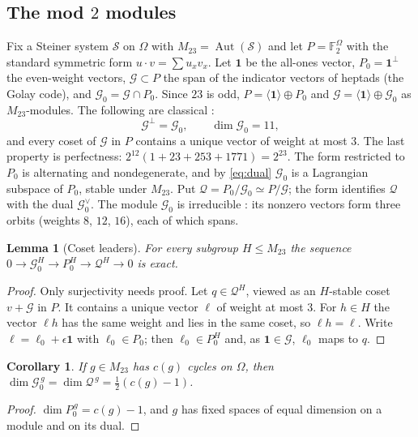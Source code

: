 \documentclass[11pt]{amsart}
\newtheorem{lemma}[theorem]{Lemma}
\newtheorem{corollary}[theorem]{Corollary}
\theoremstyle{definition}
\newcommand{\FF}{\mathbb{F}}
\newcommand{\Aut}{\operatorname{Aut}}
\newcommand{\M}{M_{23}}
\newcommand{\cG}{\mathcal{G}}
\newcommand{\cQ}{\mathcal{Q}}
\newcommand{\cS}{\mathcal{S}}
\newcommand{\one}{\mathbf{1}}
\begin{document}


\subsection{The mod $2$ modules}\label{ssec:modules}
Fix a Steiner system $\cS$ on $\Omega$ with $\M=\Aut(\cS)$ and let $P=\FF_2^\Omega$ with the standard symmetric form $u\cdot v=\sum u_xv_x$. Let $\one$ be the all-ones vector, $P_0=\one^\perp$ the even-weight vectors, $\cG\subset P$ the span of the indicator vectors of heptads (the Golay code), and $\cG_0=\cG\cap P_0$. Since $23$ is odd, $P=\langle\one\rangle\oplus P_0$ and $\cG=\langle\one\rangle\oplus\cG_0$ as $\M$-modules. The following are classical \cite{MS77}:
\begin{equation}\label{eq:dual}
\cG^\perp=\cG_0,\qquad \dim\cG_0=11,
\end{equation}
and every coset of $\cG$ in $P$ contains a unique vector of weight at most $3$. The last property is perfectness: $2^{12}(1+23+253+1771)=2^{23}$. The form restricted to $P_0$ is alternating and nondegenerate, and by \eqref{eq:dual} $\cG_0$ is a Lagrangian subspace of $P_0$, stable under $\M$. Put $\cQ=P_0/\cG_0\simeq P/\cG$; the form identifies $\cQ$ with the dual $\cG_0^\vee$. The module $\cG_0$ is irreducible \cite{James73}: its nonzero vectors form three orbits (weights $8$, $12$, $16$), each of which spans.

\begin{lemma}[Coset leaders]\label{lem:leaders}
For every subgroup $H\le\M$ the sequence $0\to\cG_0^{H}\to P_0^{H}\to\cQ^{H}\to0$ is exact.
\end{lemma}
\begin{proof}
Only surjectivity needs proof. Let $q\in\cQ^H$, viewed as an $H$-stable coset $v+\cG$ in $P$. It contains a unique vector $\ell$ of weight at most $3$. For $h\in H$ the vector $\ell h$ has the same weight and lies in the same coset, so $\ell h=\ell$. Write $\ell=\ell_0+\epsilon\one$ with $\ell_0\in P_0$; then $\ell_0\in P_0^H$ and, as $\one\in\cG$, $\ell_0$ maps to $q$.
\end{proof}

\begin{corollary}\label{cor:fixed}
If $g\in\M$ has $c(g)$ cycles on $\Omega$, then $\dim\cG_0^{\,g}=\dim\cQ^{\,g}=\tfrac12(c(g)-1)$.
\end{corollary}
\begin{proof}
$\dim P_0^{\,g}=c(g)-1$, and $g$ has fixed spaces of equal dimension on a module and on its dual.
\end{proof}
\end{document}
